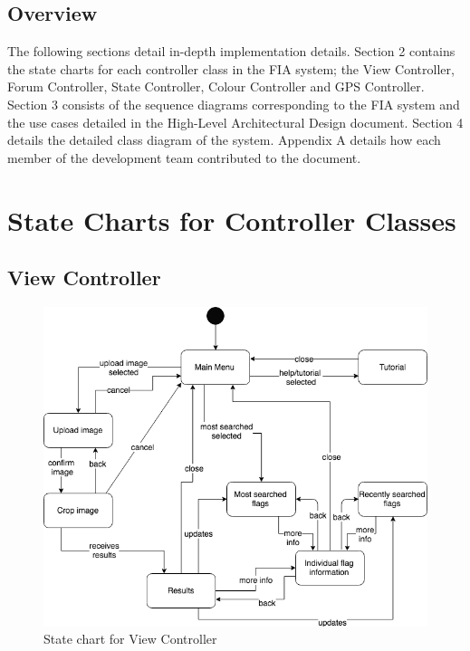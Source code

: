 \documentclass[12pt,fleqn]{article}
\begin{document}
\subsection{Overview}
The following sections detail in-depth implementation details.  Section 2 contains the state charts for each controller class in the FIA system; the View Controller, Forum Controller, State Controller, Colour Controller and GPS Controller.  Section 3 consists of the sequence diagrams corresponding to the FIA system and the use cases detailed in the High-Level Architectural Design document.  Section 4 details the detailed class diagram of the system.  Appendix A details how each member of the development team contributed to the document.

\section{State Charts for Controller Classes}
\subsection{View Controller}
\begin{figure}[H]
    \centering
    \includegraphics[scale=0.6]{img/View_Controller.png}
    \caption{State chart for View Controller}
\end{figure}
\end{document}
